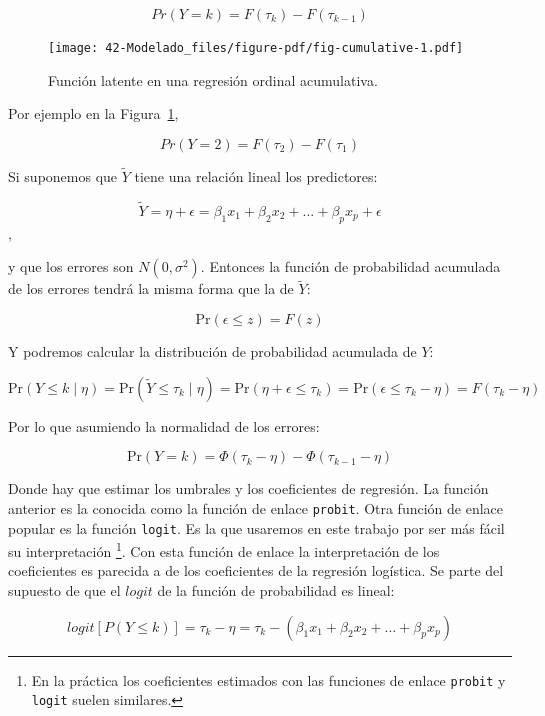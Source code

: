 \documentclass[
  12pt,
  a4paper,
  extrafontsizes,
  onecolumn,
  openright]{memoir}
\begin{document}
\[Pr(Y = k) = F(\tau_k) - F(\tau_{k-1})\]

\begin{figure}[h]

{\centering \texttt{[image: 42-Modelado\_files/figure-pdf/fig-cumulative-1.pdf]}

}

\caption{\label{fig-cumulative}Función latente en una regresión ordinal
acumulativa.}

\end{figure}

Por ejemplo en la Figura~\ref{fig-cumulative},

\[Pr(Y = 2) = F(\tau_2) - F(\tau_{1})\]

Si suponemos que \(\tilde{Y}\) tiene una relación lineal los
predictores:

\[\tilde{Y} = \eta + \epsilon = \beta_1 x_1 + \beta_2 x_2 + ... + \beta_p x_p + \epsilon\],

y que los errores son \(N(0,\sigma^2)\). Entonces la función de
probabilidad acumulada de los errores tendrá la misma forma que la de
\(\tilde{Y}\):

\[\mathrm{Pr}(\epsilon \leq z) = F(z)\]

Y podremos calcular la distribución de probabilidad acumulada de \(Y\):

\[\mathrm{Pr}(Y \leq k \mid \eta) = \mathrm{Pr}(\tilde{Y} \leq \tau_k \mid \eta) = \mathrm{Pr}(\eta + \epsilon \leq \tau_k) = \mathrm{Pr}(\epsilon \leq \tau_k - \eta) = F(\tau_k - \eta)\]

Por lo que asumiendo la normalidad de los errores:

\[\mathrm{Pr}(Y = k) = \Phi(\tau_k - \eta) - \Phi(\tau_{k - 1} - \eta)\]

Donde hay que estimar los umbrales y los coeficientes de regresión. La
función anterior es la conocida como la función de enlace
\texttt{probit}. Otra función de enlace popular es la función
\texttt{logit}. Es la que usaremos en este trabajo por ser más fácil su
interpretación \footnote{En la práctica los coeficientes estimados con
  las funciones de enlace \texttt{probit} y \texttt{logit} suelen
  similares.}. Con esta función de enlace la interpretación de los
coeficientes es parecida a de los coeficientes de la regresión
logística. Se parte del supuesto de que el \(logit\) de la función de
probabilidad es lineal:

\[logit [P(Y \le k)] = \tau_{k} - \eta = \tau_{k} - (\beta_1 x_1 + \beta_2 x_2 + ... + \beta_p x_p)\]
\end{document}
